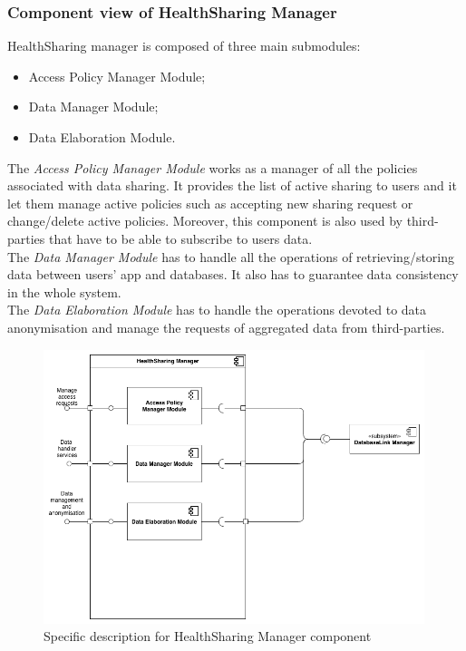 \documentclass[DD.tex]{subfiles}
\begin{document}
\newpage
\subsubsection{Component view of HealthSharing Manager}
HealthSharing manager is composed of three main submodules: \begin{itemize}
	\item Access Policy Manager Module;
	\item Data Manager Module;
	\item Data Elaboration Module.
\end{itemize}

The \textit{Access Policy Manager Module} works as a manager of all the policies associated with data sharing. It provides the list of active sharing to users and it let them manage active policies such as accepting new sharing request or change/delete active policies. Moreover, this component is also used by third-parties that have to be able to subscribe to users data.\\
The \textit{Data Manager Module} has to handle all the operations of retrieving/storing data between users' app and databases. It also has to guarantee data consistency in the whole system.
	\\
The \textit{Data Elaboration Module} has to handle the operations devoted to  data anonymisation and manage the requests of aggregated data from third-parties.

\begin{figure}[h!]
	\centering
	\includegraphics[height=8.00cm,keepaspectratio]{Figures/HealthSharingManagerComponent}
	\caption{Specific description for HealthSharing Manager component}
\end{figure}
\newpage
\end{document}
